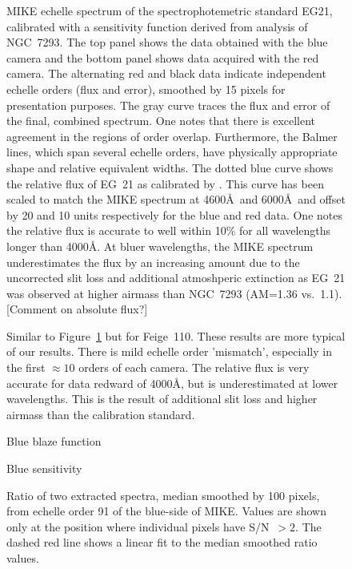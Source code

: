 \documentclass[12pt,preprint]{aastex}
\begin{document}
\begin{figure}
\caption{MIKE echelle spectrum of the spectrophotemetric
standard EG21, calibrated with a sensitivity function derived
from analysis of NGC~7293.  The top panel shows the data
obtained with the blue camera and the bottom panel shows data
acquired with the red camera.  
The alternating red and black data
indicate independent echelle orders (flux and error), 
smoothed by 15 pixels for presentation purposes.  The gray curve 
traces the flux and error of the final, combined spectrum.
One notes that there is excellent agreement in the regions of
order overlap.  Furthermore, the Balmer lines, which span 
several echelle orders, have physically appropriate shape
and relative equivalent widths.
The dotted blue curve shows the relative flux of EG~21 as
calibrated by \cite{hamuy94}.  This curve
has been scaled to match the MIKE spectrum at 4600\AA\
and 6000\AA\ and offset by 20 and 10 units respectively for the
blue and red data.  One notes the relative flux is accurate to
well within 10$\%$ for all wavelengths longer than 4000\AA.
At bluer wavelengths, the MIKE spectrum underestimates the flux
by an increasing amount due to the uncorrected slit loss and 
additional atmoshperic extinction as EG~21 was observed at
higher airmass than NGC~7293 (AM=1.36 vs.\ 1.1).
[Comment on absolute flux?]
}
\label{fig:eg21}
\end{figure}

\begin{figure}
\caption{Similar to Figure~\ref{fig:eg21} but for Feige~110.
These results are more typical of our results.  There is mild
echelle order 'mismatch', especially in the first $\approx 10$
orders of each camera.  The relative flux is very accurate for
data redward of 4000\AA, but is underestimated at
lower wavelengths.  This is the result of additional slit loss
and higher airmass than the calibration standard.
}
\label{fig:feige110}
\end{figure}

\begin{figure}
\caption{Blue blaze function
}
\label{fig:blaze}
\end{figure}

\begin{figure}
\caption{Blue sensitivity
}
\label{fig:sensitivity}
\end{figure}

\begin{figure}
\caption{Ratio of two extracted spectra, median smoothed by
100 pixels,  from echelle order 91 of the blue-side of MIKE.
Values are shown only at the position where individual pixels 
have S/N~$>2$. The dashed red line shows a linear fit to the
median smoothed ratio values.
}
\label{fig:hsnpix}
\end{figure}
\end{document}
